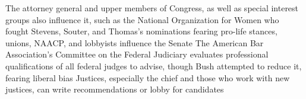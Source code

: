 \documentclass[11 pt, twoside]{article}
\newenvironment{outline*}
{
	\begin{outline}[enumerate]
	}
	{\end{outline}
}
\begin{document}
\begin{outline*}
\2 The attorney general and upper members of Congress, as well as special interest groups also influence it, such as the National Organization for Women who fought Stevens, Souter, and Thomas’s nominations fearing pro-life stances, unions, NAACP, and lobbyists influence the Senate
\2 The American Bar Association’s Committee on the Federal Judiciary evaluates professional qualifications of all federal judges to advise, though Bush attempted to reduce it, fearing liberal bias
\2 Justices, especially the chief and those who work with new justices, can write recommendations or lobby for candidates
\end{outline*}
\end{document}
